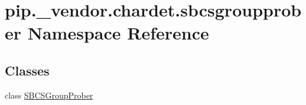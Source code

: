 \hypertarget{namespacepip_1_1__vendor_1_1chardet_1_1sbcsgroupprober}{}\section{pip.\+\_\+vendor.\+chardet.\+sbcsgroupprober Namespace Reference}
\label{namespacepip_1_1__vendor_1_1chardet_1_1sbcsgroupprober}
\subsection*{Classes}
\begin{DoxyCompactItemize}
\item 
class \hyperlink{classpip_1_1__vendor_1_1chardet_1_1sbcsgroupprober_1_1SBCSGroupProber}{S\+B\+C\+S\+Group\+Prober}
\end{DoxyCompactItemize}
